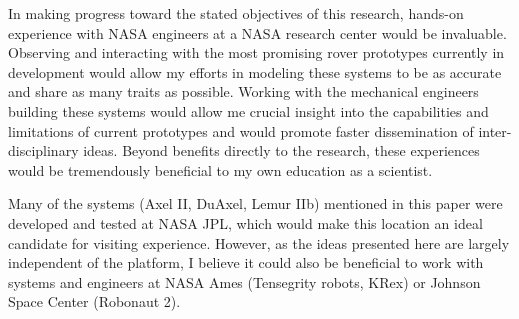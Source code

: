 \documentclass[12pt]{article}
\begin{document}
In making progress toward the stated objectives of this research, hands-on experience with NASA 
engineers at a NASA research center would be invaluable. Observing and interacting with the most promising 
rover prototypes currently in development would allow my efforts in modeling these systems to be as accurate 
and share as many traits as possible. Working with the mechanical engineers building these systems would 
allow me crucial insight into the capabilities and limitations of current prototypes and would promote 
faster dissemination of inter-disciplinary ideas. Beyond benefits directly to the research, these experiences 
would be tremendously beneficial to my own education as a scientist. 

Many of the systems (Axel II, DuAxel, Lemur IIb) mentioned in this paper were developed and tested at NASA 
JPL, which would make this location an ideal candidate for visiting experience. However, as the ideas presented here 
are largely independent of the platform, I believe it could also be beneficial to work with systems and 
engineers at NASA Ames (Tensegrity robots, KRex) or Johnson Space Center (Robonaut 2).



\newpage

\small{}

\end{document}
